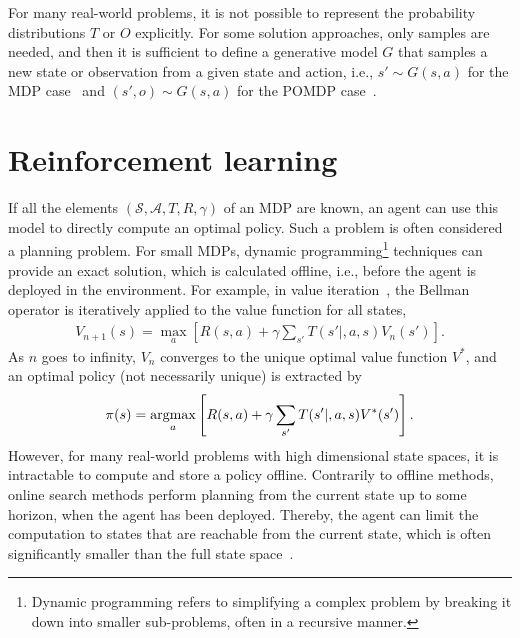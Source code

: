

For many real-world problems, it is not possible to represent the probability distributions $T$ or $O$ explicitly. For some solution approaches, only samples are needed, and then it is sufficient to define a generative model $G$ that samples a new state or observation from a given state and action, i.e., $s' \sim G(s,a)$ for the MDP case~\cite[Ch. 4]{Kochenderfer2015} and $(s', o) \sim G(s,a)$ for the POMDP case~\cite[Ch. 6]{Kochenderfer2015}.


\section{Reinforcement learning}
\label{sec:rl}

If all the elements $( \mathcal{S}, \mathcal{A}, T, R, \gamma )$ of an MDP are known, an agent can use this model to directly compute an optimal policy. Such a problem is often considered a planning problem. For small MDPs, dynamic programming\footnote{Dynamic programming refers to simplifying a complex problem by breaking it down into smaller sub-problems, often in a recursive manner.} techniques can provide an exact solution, which is calculated offline, i.e., before the agent is deployed in the environment. For example, in value iteration~\cite[Ch. 4]{Kochenderfer2015}, the Bellman operator is iteratively applied to the value function for all states,
%
\begin{align}
    V_{n+1}(s) = \max_a \left[ R(s,a) + \gamma \sum_{s'}T(s'|,a,s)V_n(s') \right].
\end{align}
%
As $n$ goes to infinity, $V_n$ converges to the unique optimal value function $V^*$, and an optimal policy (not necessarily unique) is extracted by
%
\begin{align}
    \pi(s) = \operatorname*{argmax}_a \left[ R(s,a) + \gamma \sum_{s'}T(s'|,a,s)V^*(s') \right].
\end{align}
%
However, for many real-world problems with high dimensional state spaces, it is intractable to compute and store a policy offline. Contrarily to offline methods, online search methods perform planning from the current state up to some horizon, when the agent has been deployed. Thereby, the agent can limit the computation to states that are reachable from the current state, which is often significantly smaller than the full state space~\cite[Ch. 4]{Kochenderfer2015}.

